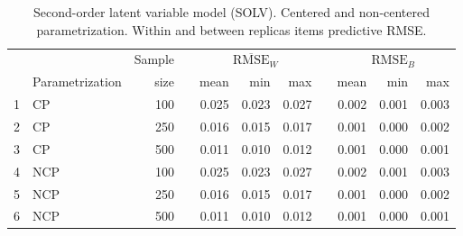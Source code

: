 %
\begin{table}[H]
	\centering
	\begin{tabular}{rlrrrrrrrrr}
		\hline
		&  & Sample && \multicolumn{3}{c}{ $\overline{\text{RMSE}}_{W}$ } && \multicolumn{3}{c}{ $\text{RMSE}_{B}$ } \\
		\cmidrule(rl){5-7} \cmidrule(rl){9-11}  
		& Parametrization & size  && mean & min & max && mean & min & max \\ 
		\hline\hline
		1 & CP & 100 && 0.025 & 0.023 & 0.027 && 0.002 & 0.001 & 0.003 \\
		2 & CP & 250 && 0.016 & 0.015 & 0.017 && 0.001 & 0.000 & 0.002 \\  
		3 & CP & 500 && 0.011 & 0.010 & 0.012 && 0.001 & 0.000 & 0.001 \\ 
		\hline
		4 & NCP & 100 && 0.025 & 0.023 & 0.027 && 0.002 & 0.001 & 0.003 \\
		5 & NCP & 250 && 0.016 & 0.015 & 0.017 && 0.001 & 0.000 & 0.002 \\ 
		6 & NCP & 500 && 0.011 & 0.010 & 0.012 && 0.001 & 0.000 & 0.001 \\  
		\hline
	\end{tabular}
	\caption[Second-order latent variable model (SOLV). Centered and non-centered parametrization. Within and between replicas items predictive RMSE.]%
	{Second-order latent variable model (SOLV). Centered and non-centered parametrization. Within and between replicas items predictive RMSE.}
	\label{tab:SOLV_accuracy_items}
\end{table}